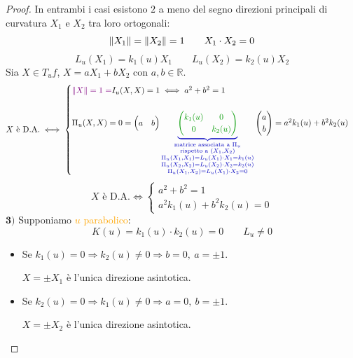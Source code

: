 \begin{proof}
        In entrambi i casi esistono $2$ a meno del segno direzioni principali di curvatura $X_1$ e $X_2$ tra loro ortogonali:
        \[
        \lVert X_1\rVert = \lVert X_2\rVert = 1 \qquad X_1 \cdot X_2 = 0
        \]
        \[
        L_u(X_1) = k_1(u) X_1 \qquad L_u(X_2) = k_2(u) X_2
        \]
        Sia $X \in T_u f$, $X = a X_1 + b X_2$ con $a, b \in \mathbb{R}$.
        \[ X \text{ è D.A.} \iff \begin{cases} \textcolor{violet}{\norm{X}=1=} I_u(X,X) = 1 \iff a^2 + b^2 = 1 \\[6mm] \Pi_u(X,X) = 0 = \begin{pmatrix} a & b \end{pmatrix} 
            \textcolor{blu}{\underbrace{\textcolor{verde}{\begin{pmatrix} k_1(u) & 0 \\ 0 & k_2(u) \end{pmatrix}}}_{\substack{\text{matrice associata a } \Pi_u \\ \text{rispetto a } (X_1, X_2) \\ \Pi_u(X_1,X_1)=L_u(X_1) \cdot X_1 = k_1(u) \\ \Pi_u(X_2,X_2)=L_u(X_2) \cdot X_2 = k_2(u) \\  \Pi_u(X_1,X_2)=L_u(X_1) \cdot X_2 = 0 }}} \begin{pmatrix} a \\ b \end{pmatrix} = a^2 k_1(u) + b^2 k_2(u) \end{cases}  \]
        \[ X \text{ è D.A.} \iff  \begin{cases} a^2 + b^2 = 1 \\ a^2 k_1(u) + b^2 k_2(u) = 0 \end{cases} \]
        \newpage
        $\mathbf{3)}$ Supponiamo \textcolor{orange}{$u$ parabolico}:
        \[
        K(u) = k_1(u) \cdot k_2(u) = 0 \qquad L_u \neq 0
        \]
        \begin{itemize}
            \item Se $k_1(u) = 0 \Rightarrow k_2(u) \neq 0 \Rightarrow b = 0, \ a = \pm 1$.
            
            $X = \pm X_1$ è l'unica direzione asintotica.
            \item Se $k_2(u) = 0 \Rightarrow k_1(u) \neq 0 \Rightarrow a = 0, \ b = \pm 1$.
            
            $X = \pm X_2$ è l'unica direzione asintotica.
        \end{itemize}


\end{proof}
